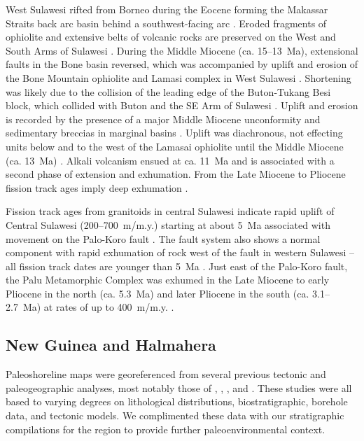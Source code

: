 \documentclass[11pt,letterpaper]{article}
\begin{document}
West Sulawesi rifted from Borneo during the Eocene forming the Makassar Straits back arc basin behind a southwest-facing arc \citep{Polve1997a}. Eroded fragments of ophiolite and extensive belts of volcanic rocks are preserved on the West and South Arms of Sulawesi \citep{Bergman1996a, vanLeeuwen2010a}. During the Middle Miocene (ca. 15--13~Ma), extensional faults in the Bone basin reversed, which was accompanied by uplift and erosion of the Bone Mountain ophiolite and Lamasi complex in West Sulawesi \citep{Bergman1996a, vanLeeuwen2010a}. Shortening was likely due to the collision of the leading edge of the Buton-Tukang Besi block, which collided with Buton and the SE Arm of Sulawesi \citep{Smith1991a}. Uplift and erosion is recorded by the presence of a major Middle Miocene unconformity and sedimentary breccias in marginal basins \citep{Bergman1996a, vanLeeuwen2010a}. Uplift was diachronous, not effecting units below and to the west of the Lamasai ophiolite until the Middle Miocene (ca. 13~Ma) \citep{vanLeeuwen2010a}. Alkali volcanism ensued at ca. 11~Ma and is associated with a second phase of extension and exhumation. From the Late Miocene to Pliocene fission track ages imply deep exhumation \citep{Smith1991a, Bergman1996a, vanLeeuwen2010a}.

Fission track ages from granitoids in central Sulawesi indicate rapid uplift of Central Sulawesi (200--700~m/m.y.) starting at about 5~Ma associated with movement on the Palo-Koro fault \citep{Bellier2006a}. The fault system also shows a normal component with rapid exhumation of rock west of the fault in western Sulawesi -- all fission track dates are younger than 5~Ma \citep{Bellier2006a}. Just east of the Palo-Koro fault, the Palu Metamorphic Complex was exhumed in the Late Miocene to early Pliocene in the north (ca. 5.3~Ma) and later Pliocene in the south (ca. 3.1--2.7~Ma) at rates of up to 400~m/m.y. \citep{Hennig2017b}.

\subsection*{New Guinea and Halmahera}

Paleoshoreline maps were georeferenced from several previous tectonic and paleogeographic analyses, most notably those of \citet{Nichols1991a}, \citet{Cloos2005a}, \citet{Gold2017a}, and \citet{Harrington2017a}. These studies were all based to varying degrees on lithological distributions, biostratigraphic, borehole data, and tectonic models. We complimented these data with our stratigraphic compilations for the region to provide further paleoenvironmental context.
\end{document}
